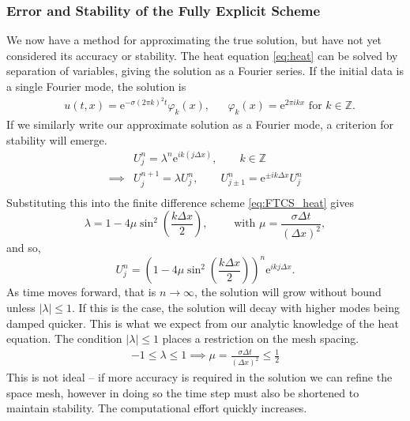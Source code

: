 \documentclass[11pt, a4paper, draft]{article}
\renewcommand{\phi}{\varphi}
\newcommand{\Z}{\mathbb{Z}}
\newcommand{\Dt}{\Delta t}
\newcommand{\Dx}{\Delta x}
\begin{document}
        \subsubsection*{Error and Stability of the Fully Explicit Scheme}
        We now have a method for approximating the true solution, but have not yet considered its accuracy or stability. The heat equation \eqref{eq:heat} can be solved by separation of variables, giving the solution as a Fourier series. If the initial data is a single Fourier mode, the solution is
        \begin{align*}
            &u(t,x) = \mathrm{e}^{-\sigma(2\pi k)^2 t} \phi_k(x), && \phi_k(x) = \mathrm{e}^{2\pi i k x} \text{ for } k \in \Z.
        \end{align*} 
        If we similarly write our approximate solution as a Fourier mode, a criterion for stability will emerge.
        \begin{align*}
            &U^n_j = \lambda^n \mathrm{e}^{ik(j\Dx)}, \qquad k \in \Z \\
            \implies &U^{n+1}_j = \lambda U^n_j, \qquad U^n_{j\pm 1} = \mathrm{e}^{\pm ik\Dx}U^n_j  \\
        \end{align*}
        Substituting this into the finite difference scheme \eqref{eq:FTCS_heat} gives
        \[
            \lambda = 1 - 4\mu \sin^2\left(\frac{k\Dx}{2}\right), \qquad \text{ with } \mu = \frac{\sigma \Dt}{(\Dx) ^2},
        \]
        and so,
        \[
            U^n_j = \left(1 - 4\mu \sin^2\left(\frac{k\Dx}{2}\right)\right)^n\mathrm{e}^{ikj\Dx}.
        \]
        As time moves forward, that is $n \to \infty$, the solution will grow without bound unless $|\lambda|\leq 1$. If this is the case, the solution will decay with higher modes being damped quicker. This is what we expect from our analytic knowledge of the heat equation. The condition $|\lambda|\leq 1$ places a restriction on the mesh spacing.
        \begin{align*}
            -1 \leq \lambda \leq 1 \implies  \mu = \frac{\sigma \Dt}{(\Dx) ^2} \leq \frac{1}{2}
        \end{align*}
        This is not ideal -- if more accuracy is required in the solution we can refine the space mesh, however in doing so the time step must also be shortened to maintain stability. The computational effort quickly increases.
        
\end{document}
